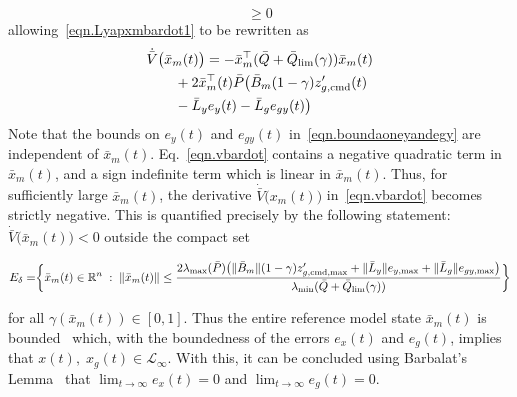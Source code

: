 \documentclass[journal]{IEEEtran}
\theoremstyle{innercustomthm}
\begin{document}
\begin{proof-dan}
\begin{equation}
      \geq
      0
    \end{equation}
    allowing\ \eqref{eqn.Lyapxmbardot1} to be rewritten as
    \begin{equation}
      \label{eqn.vbardot}
      \begin{split}
        &
        \dot{\bar{V}}\bigr(\bar{x}_{m}(t)\bigr)
        =
        -\bar{x}_{m}^{\top}(\bar{Q}+\bar{Q}_{\rm{\lim}}(\gamma))\bar{x}_{m}(t) \\
        & \qquad
        + 2\bar{x}_{m}^{\top}(t)\bar{P}\bigr(\bar{B}_{m}(1-\gamma)z_{g,\text{cmd}}^{\prime}(t) \\
        & \qquad
        - \bar{L}_{y}e_{y}(t) - \bar{L}_{g}e_{gy}(t)\bigr)
      \end{split}
    \end{equation}
    Note that the bounds on $e_{y}(t)$ and $e_{gy}(t)$ in\ \eqref{eqn.boundaoneyandegy} are independent of $\bar{x}_{m}(t)$.
    Eq.\ \eqref{eqn.vbardot} contains a negative quadratic term in $\bar{x}_{m}(t)$, and a sign indefinite term which is linear in $\bar{x}_{m}(t)$.
    Thus, for sufficiently large $\bar{x}_{m}(t)$, the derivative $\dot{\bar{V}}\bigr(x_{m}(t)\bigr)$ in\ \eqref{eqn.vbardot} becomes strictly negative.
    This is quantified precisely by the following statement: $\dot{\bar{V}}\bigr(\bar{x}_{m}(t)\bigr)<0$ outside the compact set

    \begin{widetext}
      \vspace{0.2in}
      \begin{equation}
        \label{eqn.limiterCompactSet}
        E_{\delta}=
        \biggr\{%
        \bar{x}_{m}(t)\in\mathbb{R}^{n} \; : \;
        \|\bar{x}_{m}(t)\|
        \leq
        \frac{2\lambda_{\text{max}}(\bar{P})\bigr(
        \|\bar{B}_{m}\|(1-\gamma)z_{g,\text{cmd,max}}^{\prime}+
        \|\bar{L}_{y}\|e_{y,\text{max}}+\|\bar{L}_{g}\|e_{gy,\text{max}}
        \bigr)}{\lambda_{\text{min}}(\bar{Q}+\bar{Q}_{\text{lim}}(\gamma))}
        \biggr\} \\[12pt]
      \end{equation}
      \noindent\makebox[\linewidth]{\rule{\textwidth}{0.2pt}}
      \vspace{-0.3in}
    \end{widetext}
    for all $\gamma(\bar{x}_{m}(t))\in[0,1]$.
    Thus the entire reference model state $\bar{x}_{m}(t)$ is bounded\ \cite{narendra.stable.2005} which, with the boundedness of the errors $e_{x}(t)$ and $e_{g}(t)$, implies that $x(t),\;x_{g}(t)\in\mathcal{L}_{\infty}$.
    With this, it can be concluded using Barbalat's Lemma\ \cite{narendra.stable.2005} that $\lim_{t\rightarrow\infty}e_{x}(t)=0$ and $\lim_{t\rightarrow\infty}e_{g}(t)=0$.
  \end{proof-dan}
\end{document}
